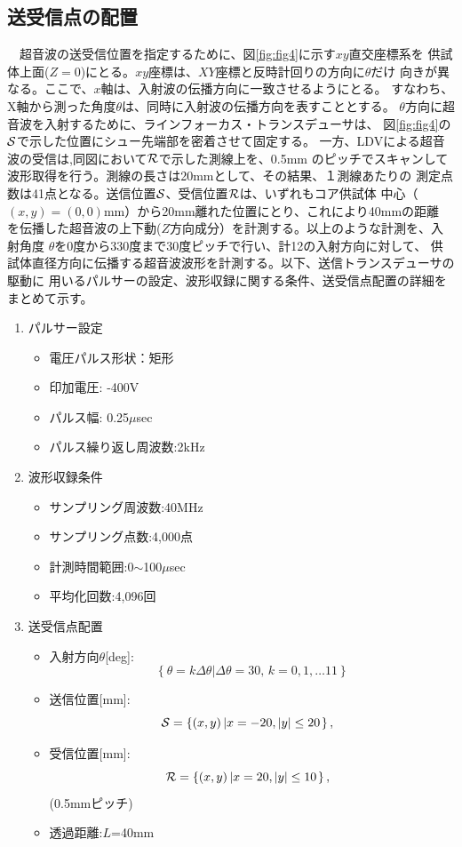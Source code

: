 \subsection{送受信点の配置}
　超音波の送受信位置を指定するために、図\ref{fig:fig4}に示す$xy$直交座標系を
供試体上面($Z=0$)にとる。$xy$座標は、$XY$座標と反時計回りの方向に$\theta$だけ
向きが異なる。ここで、$x$軸は、入射波の伝播方向に一致させるようにとる。
すなわち、X軸から測った角度$\theta$は、同時に入射波の伝播方向を表すこととする。
$\theta$方向に超音波を入射するために、ラインフォーカス・トランスデューサは、
図\ref{fig:fig4}の$\cal S$で示した位置にシュー先端部を密着させて固定する。
一方、LDVによる超音波の受信は,同図において${\cal R}$で示した測線上を、0.5mm
のピッチでスキャンして波形取得を行う。測線の長さは20mmとして、その結果、１測線あたりの
測定点数は41点となる。送信位置$\cal S$、受信位置$\cal R$は、いずれもコア供試体
中心（$(x,y)=(0,0)$mm）から20mm離れた位置にとり、これにより40mmの距離
を伝播した超音波の上下動($Z$方向成分）を計測する。以上のような計測を、入射角度
$\theta$を0度から330度まで30度ピッチで行い、計12の入射方向に対して、
供試体直径方向に伝播する超音波波形を計測する。以下、送信トランスデューサの駆動に
用いるパルサーの設定、波形収録に関する条件、送受信点配置の詳細をまとめて示す。
\begin{enumerate}
\item パルサー設定
	\begin{itemize}
		\item 電圧パルス形状：矩形
		\item 印加電圧: -400V
		\item パルス幅: 0.25$\mu$sec 
		\item パルス繰り返し周波数:2kHz
	\end{itemize}
\item 波形収録条件
	\begin{itemize}
		\item サンプリング周波数:40MHz
		\item サンプリング点数:4,000点
		\item 計測時間範囲:0$\sim$100$\mu$sec
		\item 平均化回数:4,096回
	\end{itemize}
\item 送受信点配置
	\begin{itemize}
		\item 入射方向$\theta$[deg]:
	\[		
				\left\{ 
				\theta=k \Delta \theta \left| \Delta \theta=30,\, k=0,1,\dots 11\right.
				\right\}
			\]
		\item 送信位置[mm]:
			\[
				{\cal S}=\left\{ (x,y)\left| x=-20, |y| \leq 20\right.\right\}, \ \ 
			\]
		\item 受信位置[mm]:
			\[
				{\cal R}=\left\{ (x,y)\left| x=20,  |y| \leq 10\right.\right\}, \ \ 
			\](0.5mmピッチ)
		\item 透過距離:$L$=40mm
	\end{itemize}
\end{enumerate}

